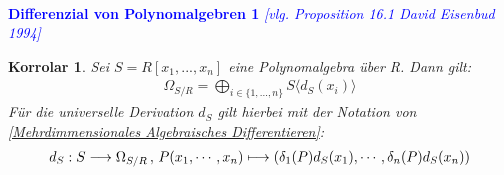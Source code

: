 \documentclass[10pt,a4paper]{report}
\newcommand{\ModulsOfDifferenzials}{David Eisenbud 1994}
\newcounter{Aussage}[chapter]
\newtheorem{korrolar}[Aussage]{Korrolar}
\newcommand{\function}[5]{\nolinebreak{#1:#2 \longrightarrow #3 \, , \, #4 \longmapsto #5}}
\newcommand{\divR}[2]{\Omega_{#1/#2}}
\newcommand{\divf}[1]{d_{#1}}
\begin{document}
\ \\
\textcolor{blue}{\textbf{Differenzial von Polynomalgebren 1} \textit{[vlg. Proposition 16.1 \ModulsOfDifferenzials]}}
\begin{korrolar}\label{Differenzial von Polynomalgebren 1}
Sei $S = R[x_1,...,x_n]$ eine Polynomalgebra über R. Dann gilt:
\begin{gather*}
\divR{S}{R} = \bigoplus_{i \in \lbrace 1,...,n \rbrace} S \langle \divf{S}(x_i) \rangle 
\end{gather*}
Für die universelle Derivation $\divf{S}$ gilt hierbei mit der Notation von \cref{Mehrdimmensionales Algebraisches Differentieren}:
\begin{gather*}
\function{\divf{S}}{S}{\divR{S}{R}}{P(x_1,\cdots,x_n)}{(\delta_{1}(P)\divf{S}(x_1), \cdots , \delta_{n}(P)\divf{S}(x_n))}
\end{gather*}
\end{korrolar}
\end{document}
